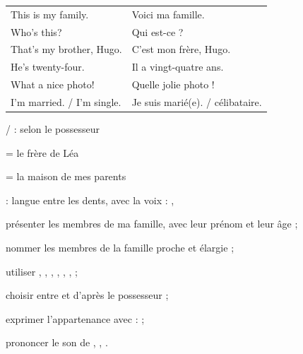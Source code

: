 \begin{essentiel}
\begin{minipage}[t]{0.52\linewidth}
\renewcommand{\arraystretch}{1.32}
\begin{tabular}{@{}>{\enOn\otSemi\fontsize{9.4}{11}\selectfont}l<{\enOff}@{\hspace{3mm}}>{\fontsize{9.2}{11}\selectfont\color{white!78!otNavy}}l@{}}
This is my family.          & Voici ma famille.\\
Who's this?                 & Qui est-ce ?\\
That's my brother, Hugo.    & C'est mon frère, Hugo.\\
He's twenty-four.           & Il a vingt-quatre ans.\\
What a nice photo!          & Quelle jolie photo !\\
I'm married. / I'm single.  & Je suis marié(e). / célibataire.\\
\end{tabular}
\end{minipage}\hfill
\begin{minipage}[t]{0.42\linewidth}
{}\par
{\fontsize{9}{11.4}\selectfont\color{white!78!otNavy} /  : selon le possesseur\par}
{\fontsize{9.2}{11.6}\selectfont {} = le frère de Léa\par
{} = la maison de mes parents\par}
{\fontsize{9.2}{11.6}\selectfont {} : langue entre les dents, avec la voix :
, \par}
\end{minipage}
\end{essentiel}

\begin{jesais}
\item présenter les membres de ma famille, avec leur prénom et leur âge ;
\item nommer les membres de la famille proche et élargie ;
\item utiliser , , , , , ,  ;
\item choisir entre  et  d'après le possesseur ;
\item exprimer l'appartenance avec  :  ;
\item prononcer le son  de , , .
\end{jesais}

